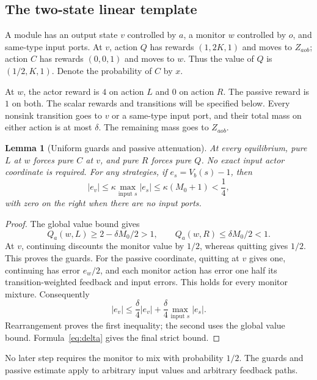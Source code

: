 \documentclass[11pt,a4paper]{article}
\numberwithin{equation}{section}
\newtheorem{lemma}[theorem]{Lemma}
\theoremstyle{definition}
\begin{document}
\subsection{The two-state linear template}

A module has an output state \(v\) controlled by \(a\), a monitor \(w\)
controlled by \(o\), and same-type input ports. At \(v\), action \(Q\)
has rewards \((1,2K,1)\) and moves to \(Z_{aob}\); action \(C\) has
rewards \((0,0,1)\) and moves to \(w\). Thus the value of \(Q\) is
\((1/2,K,1)\). Denote the probability of \(C\) by \(x\).

At \(w\), the actor reward is \(4\) on action \(L\) and \(0\) on
action \(R\). The passive reward is \(1\) on both. The scalar rewards
and transitions will be specified below. Every nonsink transition goes
to \(v\) or a same-type input port, and their total mass on either
action is at most \(\delta\). The remaining mass goes to \(Z_{aob}\).

\begin{lemma}[Uniform guards and passive attenuation]\label{lem:guard}
At every equilibrium, pure \(L\) at \(w\) forces pure \(C\) at \(v\),
and pure \(R\) forces pure \(Q\). No exact input actor coordinate is
required. For any strategies, if \(e_s=V_b(s)-1\), then
\begin{equation}\label{eq:passive}
 |e_v|\leq\kappa\max_{\text{input }s}|e_s|
            \leq\kappa(M_0+1)<\frac14,
\end{equation}
with zero on the right when there are no input ports.
\end{lemma}
\begin{proof}
The global value bound gives
\[
 Q_a(w,L)\geq2-\delta M_0/2>1,
 \qquad Q_a(w,R)\leq\delta M_0/2<1.
\]
At \(v\), continuing discounts the monitor value by \(1/2\), whereas
quitting gives \(1/2\). This proves the guards.
For the passive coordinate, quitting at \(v\) gives one, continuing
has error \(e_w/2\), and each monitor action has error one half its
transition-weighted feedback and input errors. This holds for every
monitor mixture. Consequently
\[
 |e_v|\leq\frac\delta4|e_v|
             +\frac\delta4\max_{\text{input }s}|e_s|.
\]
Rearrangement proves the first inequality; the second uses the global
value bound. Formula~\eqref{eq:delta} gives the final strict bound.
\end{proof}

No later step requires the monitor to mix with probability \(1/2\).
The guards and passive estimate apply to arbitrary input values and
arbitrary feedback paths.
\end{document}
